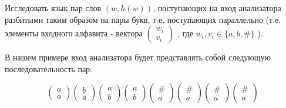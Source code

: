 \documentclass[a4paper, 14pt]{article}
\begin{document}
Исследовать язык пар слов $(w, h(w))$, поступающих на вход анализатора разбитыми таким образом на пары букв, т.е. поступающих параллельно (т.е. элементы входного алфавита - вектора
$
\begin{pmatrix}
	w_i\\
	v_i
\end{pmatrix}
$ 
, где $w_i, v_i \in \{a, b, \# \}$
). 

В нашем примере вход анализатора будет представлять собой следующую последовательность пар:

$$
\begin{pmatrix}
	a\\
	a
\end{pmatrix}
\begin{pmatrix}
	b\\
	a
\end{pmatrix}
\begin{pmatrix}
	a\\
	b	
\end{pmatrix}
\begin{pmatrix}
	a\\
	b	
\end{pmatrix}
\begin{pmatrix}
	\#\\
	a	
\end{pmatrix}
\begin{pmatrix}
	\#\\
	a	
\end{pmatrix}
\begin{pmatrix}
	\#\\
	a	
\end{pmatrix}
\begin{pmatrix}
	\#\\
	a	
\end{pmatrix}
$$
\end{document}
